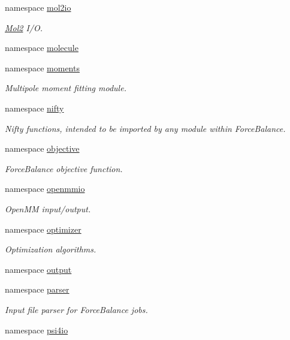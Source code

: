\begin{DoxyCompactItemize}
namespace \hyperlink{namespaceforcebalance_1_1mol2io}{mol2io}
\begin{DoxyCompactList}\small\item\em \hyperlink{namespaceforcebalance_1_1Mol2}{Mol2} I/\-O. \end{DoxyCompactList}\item 
namespace \hyperlink{namespaceforcebalance_1_1molecule}{molecule}
\item 
namespace \hyperlink{namespaceforcebalance_1_1moments}{moments}
\begin{DoxyCompactList}\small\item\em Multipole moment fitting module. \end{DoxyCompactList}\item 
namespace \hyperlink{namespaceforcebalance_1_1nifty}{nifty}
\begin{DoxyCompactList}\small\item\em Nifty functions, intended to be imported by any module within Force\-Balance. \end{DoxyCompactList}\item 
namespace \hyperlink{namespaceforcebalance_1_1objective}{objective}
\begin{DoxyCompactList}\small\item\em Force\-Balance objective function. \end{DoxyCompactList}\item 
namespace \hyperlink{namespaceforcebalance_1_1openmmio}{openmmio}
\begin{DoxyCompactList}\small\item\em Open\-M\-M input/output. \end{DoxyCompactList}\item 
namespace \hyperlink{namespaceforcebalance_1_1optimizer}{optimizer}
\begin{DoxyCompactList}\small\item\em Optimization algorithms. \end{DoxyCompactList}\item 
namespace \hyperlink{namespaceforcebalance_1_1output}{output}
\item 
namespace \hyperlink{namespaceforcebalance_1_1parser}{parser}
\begin{DoxyCompactList}\small\item\em Input file parser for Force\-Balance jobs. \end{DoxyCompactList}\item 
namespace \hyperlink{namespaceforcebalance_1_1psi4io}{psi4io}

\end{DoxyCompactItemize}
